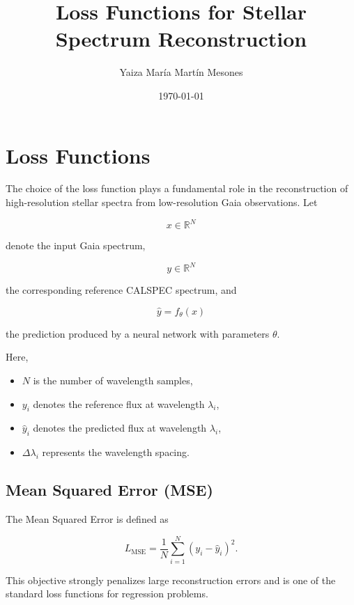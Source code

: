 \documentclass[11pt,a4paper]{article}
\title{Loss Functions for Stellar Spectrum Reconstruction}
\author{Yaiza Mar\'ia Mart\'in Mesones}
\date{\today}
\begin{document}
\maketitle

\section{Loss Functions}

The choice of the loss function plays a fundamental role in the reconstruction of high-resolution stellar spectra from low-resolution Gaia observations. Let

\[
x\in\mathbb{R}^{N}
\]

denote the input Gaia spectrum,

\[
y\in\mathbb{R}^{N}
\]

the corresponding reference CALSPEC spectrum, and

\[
\hat{y}=f_{\theta}(x)
\]

the prediction produced by a neural network with parameters
$\theta$.

Here,

\begin{itemize}
    \item $N$ is the number of wavelength samples,
    \item $y_i$ denotes the reference flux at wavelength $\lambda_i$,
    \item $\hat{y}_i$ denotes the predicted flux at wavelength $\lambda_i$,
    \item $\Delta\lambda_i$ represents the wavelength spacing.
\end{itemize}


\subsection{Mean Squared Error (MSE)}

The Mean Squared Error is defined as

\begin{equation}
L_{\mathrm{MSE}}
=
\frac{1}{N}
\sum_{i=1}^{N}
\left(y_i-\hat{y}_i\right)^2.
\end{equation}

This objective strongly penalizes large reconstruction errors and is one of the standard loss functions for regression problems.

\end{document}
